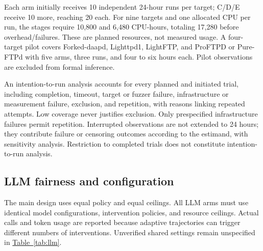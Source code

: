 \documentclass[final,5p,times,number]{elsarticle}
\newcommand{\namedref}[2]{\hyperref[#2]{#1~\ref*{#2}}}
\begin{document}
Each arm initially receives 10 independent 24-hour runs per target; C/D/E receive 10 more, reaching 20 each. For nine targets and one allocated CPU per run, the stages require 10,800 and 6,480 CPU-hours, totaling 17,280 before overhead/failures. These are planned resources, not measured usage. A four-target pilot covers Forked-daapd, Lighttpd1, LightFTP, and ProFTPD or Pure-FTPd with five arms, three runs, and four to six hours each. Pilot observations are excluded from formal inference.

An intention-to-run analysis accounts for every planned and initiated trial, including completion, timeout, target or fuzzer failure, infrastructure or measurement failure, exclusion, and repetition, with reasons linking repeated attempts. Low coverage never justifies exclusion. Only prespecified infrastructure failures permit repetition. Interrupted observations are not extended to 24 hours; they contribute failure or censoring outcomes according to the estimand, with sensitivity analysis. Restriction to completed trials does not constitute intention-to-run analysis.

\subsection{LLM fairness and configuration}
The main design uses equal policy and equal ceilings. All LLM arms must use identical model configurations, intervention policies, and resource ceilings. Actual calls and token usage are reported because adaptive trajectories can trigger different numbers of interventions. Unverified shared settings remain unspecified in \namedref{Table}{tab:llm}.
\end{document}
